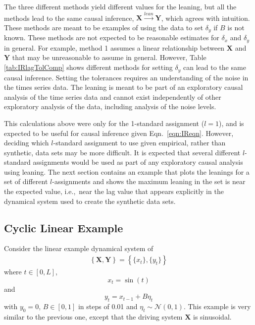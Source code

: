 \documentclass[twocolumn,aps,pre,groupedaddress]{revtex4-1}
\begin{document}
The three different methods yield different values for the leaning, but all the methods lead to the same causal inference, $\mathbf{X}\xrightarrow{lean}\mathbf{Y}$, which agrees with intuition.  These methods are meant to be examples of using the data to set $\delta_y$ if $B$ is not known.  These methods are not expected to be reasonable estimates for $\delta_x$ and $\delta_y$ in general.  For example, method 1 assumes a linear relationship between $\mathbf{X}$ and $\mathbf{Y}$ that may be unreasonable to assume in general.  However, Table \ref{tab:IRlagTolComp} shows different methods for setting $\delta_y$ can lead to the same causal inference.  Setting the tolerances requires an understanding of the noise in the times series data.  The leaning is meant to be part of an exploratory causal analysis of the time series data and cannot exist independently of other exploratory analysis of the data, including analysis of the noise levels.  

This calculations above were only for the 1-standard assignment ($l=1$), and is expected to be useful for causal inference given Eqn.\ \ref{eqn:IReqn}.  However, deciding which $l$-standard assignment to use given empirical, rather than synthetic, data sets may be more difficult.  It is expected that several different $l$-standard assignments would be used as part of any exploratory causal analysis using leaning.  The next section contains an example that plots the leanings for a set of different $l$-assignments and shows the maximum leaning in the set is near the expected value, i.e.,\ near the lag value that appears explicitly in the dynamical system used to create the synthetic data sets.  

\subsection{Cyclic Linear Example}
Consider the linear example dynamical system of
\begin{eqnarray}
\label{eqn:cyceqn}
\left\{\mathbf{X},\mathbf{Y}\right\} = \left\{\{x_t\},\{y_t\}\right\}
\end{eqnarray}
where $t\in[0,L]$,
\begin{equation*}
x_t = \sin(t)
\end{equation*}
and
\begin{equation*}
y_t = x_{t-1} + B\eta_t
\end{equation*}
with $y_0 = 0$, $B\in[0,1]$ in steps of 0.01 and $\eta_t\sim\mathcal{N}\left(0,1\right)$.  This example is very similar to the previous one, except that the driving system $\mathbf{X}$ is sinusoidal.
\end{document}
